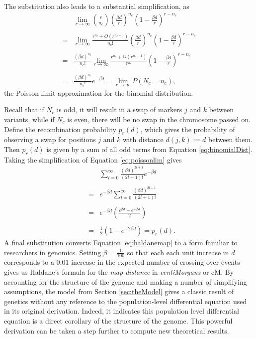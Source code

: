 \documentclass[sts]{imsart}
\begin{document}
The substitution also leads to a substantial simplification, as
\begin{eqnarray} \label{eq:poissonlim}
  & \lim_{r \rightarrow \infty} {r \choose n_c} \left ( \frac{\beta d}{r} \right )^{n_c} \left ( 1-\frac{\beta d}{r} \right )^{r - n_c} \nonumber\\
  &  \nonumber \\
  = & \lim_{r \rightarrow \infty} \frac{r^{n_c} + O(r^{n_c-1})}{n_c!} \left ( \frac{\beta d}{r} \right )^{n_c} \left ( 1-\frac{\beta d}{r} \right )^{r - n_c} \nonumber\\
  & \nonumber \\
  = & \frac{(\beta d)^{n_c}}{n_c!} \lim_{r \rightarrow \infty} \frac{r^{n_c} + O(r^{n_c-1})}{r^{n_c}} \left ( 1-\frac{\beta d}{r} \right )^{r - n_c} \nonumber\\
  & \nonumber \\
  = & \frac{(\beta d)^{n_c}}{n_c!} e^{-\beta d} = \lim_{r \rightarrow \infty} P(N_c = n_c),
\end{eqnarray}
\noindent the Poisson limit approximation for the binomial distribution.

Recall that if $N_c$ is odd, it will result in a swap of markers $j$ and $k$ between variants, while if $N_c$ is even, there will be no swap in the chromosome passed on. Define the recombination probability $p_r(d)$, which gives the probability of observing a swap for positions $j$ and $k$ with distance $d(j,k) := d$ between them. Then $p_r(d)$ is given by a sum of all odd terms from Equation \ref{eq:binomialDist}. Taking the simplification of Equation \ref{eq:poissonlim} gives
\begin{eqnarray} 
  & & \sum_{l = 0}^{\infty} \frac{(\beta d)^{2l + 1}}{(2l + 1)!} e^{-\beta d} \nonumber \\
  & & \nonumber \\
  & = & e^{-\beta d} \sum_{l = 0}^{\infty} \frac{(\beta d)^{2l + 1}}{(2l + 1)!}  \nonumber \\
  & & \nonumber \\
  & = & e^{-\beta d} \left ( \frac{e^{\beta d} - e^{- \beta d}}{2} \right ) \nonumber \\
  & & \nonumber \\
  & = & \frac{1}{2} \left ( 1 - e^{-2 \beta d} \right ) = p_r(d). \label{eq:haldanemap}
\end{eqnarray}
A final substitution converts Equation \ref{eq:haldanemap} to a form familiar to researchers in genomics. Setting $\beta = \frac{1}{100}$ so that each each unit increase in $d$ corresponds to a 0.01 increase in the expected number of crossing over events gives us Haldane's formula for the \textit{map distance} in \textit{centiMorgans} or cM. By accounting for the structure of the genome and making a number of simplifying assumptions, the model from Section \ref{sec:theModel} gives a classic result of genetics without any reference to the population-level differential equation used in its original derivation. Indeed, it indicates this population level differential equation is a direct corollary of the structure of the genome. This powerful derivation can be taken a step further to compute new theoretical results. 
\end{document}
